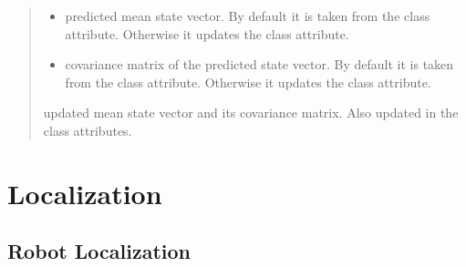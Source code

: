 \documentclass[letterpaper,10pt,english]{sphinxmanual}
\begin{document}
\begin{fulllineitems}
\begin{fulllineitems}
\begin{quote}
\begin{description}
\begin{itemize}
\item {} 
\sphinxAtStartPar
{} \textendash{} predicted mean state vector. By default it is taken from the class attribute. Otherwise it updates the class attribute.

\item {} 
\sphinxAtStartPar
{} \textendash{} covariance matrix of the predicted state vector. By default it is taken from the class attribute. Otherwise it updates the class attribute.

\end{itemize}

\sphinxAtStartPar
updated mean state vector and its covariance matrix. Also updated in the class attributes.

\end{description}\end{quote}

\end{fulllineitems}


\end{fulllineitems}


\sphinxstepscope


\section{Localization}
\label{\detokenize{Localization_index:localization}}\label{\detokenize{Localization_index::doc}}
\sphinxstepscope


\subsection{Robot Localization}
\label{\detokenize{Localization:robot-localization}}\label{\detokenize{Localization::doc}}
\begin{figure}[htbp]
\centering

\noindent{}
\end{figure}
\end{document}
